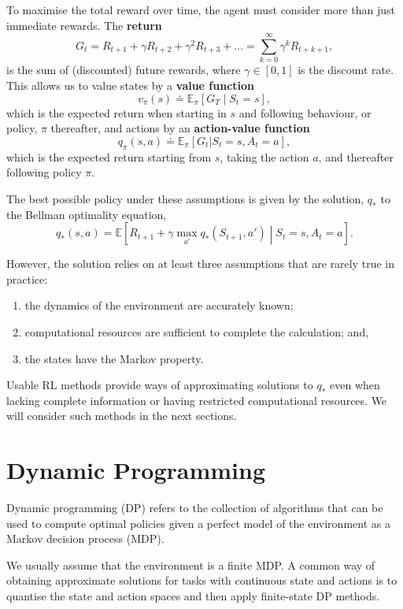 \documentclass{article}
\begin{document}
To maximise the total reward over time, the agent must consider more than just immediate rewards. The \textbf{return} $$G_t = R_{t+1} + \gamma R_{t+2} + \gamma^2 R_{t+3} + \dots = \sum_{k=0}^{\infty} \gamma^k R_{t+k+1},$$ is the sum of (discounted) future rewards, where $\gamma \in [0,1]$ is the discount rate. This allows us to value states by a \textbf{value function} $$v_\pi(s) \doteq \mathbb{E}_\pi \left[ G_T \middle| S_t = s \right],$$ which is the expected return when starting in $s$ and following behaviour, or policy, $\pi$ thereafter, and actions by an \textbf{action-value function} $$q_\pi(s, a) \doteq \mathbb{E}_\pi[G_t | S_t = s, A_t = a],$$ which is the expected return starting from $s$, taking the action $a$, and thereafter following policy $\pi$.

The best possible policy under these assumptions is given by the solution, $q_*$ to the Bellman optimality equation, $$ q_*(s,a) = \mathbb{E} \left[ R_{t+1} + \gamma \max_{a'} q_*(S_{t+1},a') \middle| S_t=s, A_t=a \right].$$ 

However, the solution relies on at least three assumptions that are rarely true in practice:

\begin{enumerate}
\def\labelenumi{\arabic{enumi}.}
\item
  the dynamics of the environment are accurately known;
\item
  computational resources are sufficient to complete the calculation; and,
\item
  the states have the Markov property.
\end{enumerate}

Usable RL methods provide ways of approximating solutions to $q_*$ even when lacking complete information or having restricted computational resources. We will consider such methods in the next sections.

\section{Dynamic Programming}

Dynamic programming (DP) refers to the collection of algorithms
that can be used to compute optimal policies given a perfect model of
the environment as a Markov decision process (MDP).

We usually assume that the environment is a finite MDP. A common way of
obtaining approximate solutions for tasks with continuous state and
actions is to quantise the state and action spaces and then apply
finite-state DP methods.
\end{document}
